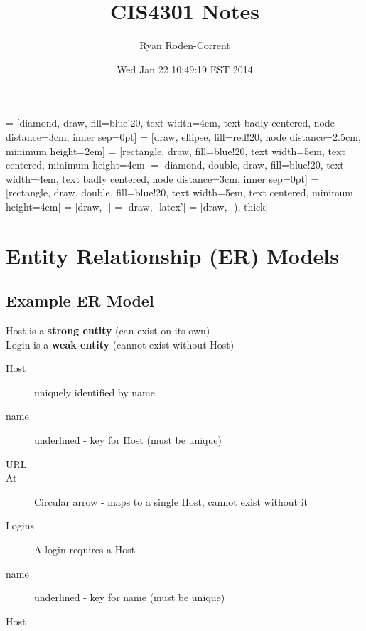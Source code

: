 \documentclass{article}
\title{CIS4301 Notes}
\author{Ryan Roden-Corrent}
\date{Wed Jan 22 10:49:19 EST 2014}
\begin{document}
\setlength\parindent{0pt}
 = [diamond, draw, fill=blue!20, text width=4em,
  text badly centered, node distance=3cm, inner sep=0pt]
 = [draw, ellipse, fill=red!20, node distance=2.5cm,
  minimum height=2em]
 = [rectangle, draw, fill=blue!20, text width=5em,
  text centered, minimum height=4em]
 = [diamond, double, draw, fill=blue!20, text width=4em,
  text badly centered, node distance=3cm, inner sep=0pt]
 = [rectangle, draw, double, fill=blue!20, text width=5em,
  text centered, minimum height=4em]
 = [draw, -]
 = [draw, -latex']
 = [draw, -), thick]
\maketitle

\section{Entity Relationship (ER) Models}
\subsection{Example ER Model}

\begin{figure}[H]
\end{figure}

Host is a \textbf{strong entity} (can exist on its own)\\
Login is a \textbf{weak entity} (cannot exist without Host)\\
\begin{description}
  \item[Host] uniquely identified by name
  \item[name] underlined - key for Host (must be unique)
  \item[URL]
  \item[At] Circular arrow - maps to a single Host, cannot exist without it
  \item[Logins] A login requires a Host
  \item[name] underlined - key for name (must be unique)
  \item[Host]
\end{description}
\end{document}

